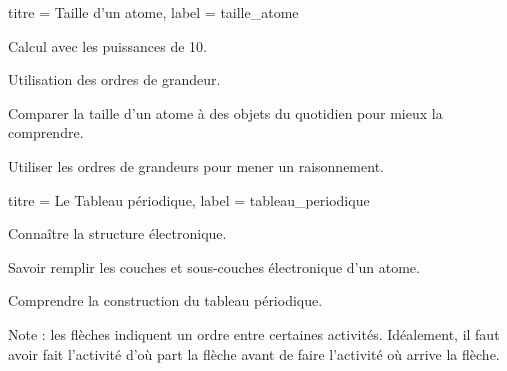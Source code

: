 \begin{multicols}{2}
  \medskip
  \begin{activite}{titre = Taille d'un atome, label = taille_atome}
    \begin{prerequis}
      \item Calcul avec les puissances de 10.
      \item Utilisation des ordres de grandeur.
    \end{prerequis}
    \begin{objectifs}
      \item Comparer la taille d'un atome à des objets du quotidien pour mieux la comprendre.
      \item Utiliser les ordres de grandeurs pour mener un raisonnement.
    \end{objectifs}
  \end{activite}

  \medskip
  \begin{TP}{titre = Le Tableau périodique, label = tableau_periodique}
    \begin{prerequis}
      \item Connaître la structure électronique.
      \item Savoir remplir les couches et sous-couches électronique d'un atome.
    \end{prerequis}
    \begin{objectifs}
      \item Comprendre la construction du tableau périodique.
    \end{objectifs}
  \end{TP}
\end{multicols}

\vspace*{-2cm}

\vspace*{1.5cm}
Note : les flèches indiquent un ordre entre certaines activités.
Idéalement, il faut avoir fait l'activité d'où part la flèche avant de faire l'activité où arrive la flèche.


\newpage
\nomPrenomClasse
{}
\vspace*{12pt}

